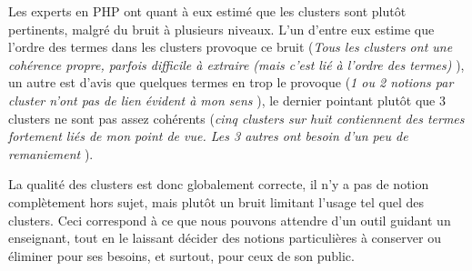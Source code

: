 Les experts en PHP ont quant à eux estimé que les clusters sont plutôt pertinents, malgré du bruit à plusieurs niveaux.
L'un d'entre eux estime que l'ordre des termes dans les clusters provoque ce bruit (\og \textit{Tous les clusters ont une cohérence propre, parfois difficile à extraire (mais c'est lié à l'ordre des termes)} \fg), un autre est d'avis que quelques termes en trop le provoque (\og \textit{1 ou 2 notions par cluster n'ont pas de lien évident à mon sens} \fg), le dernier pointant plutôt que 3 clusters ne sont pas assez cohérents (\og \textit{cinq clusters sur huit contiennent des termes fortement liés de mon point de vue. Les 3 autres ont besoin d'un peu de remaniement} \fg).

\bigskip

La qualité des clusters est donc globalement correcte, il n'y a pas de notion complètement hors sujet, mais plutôt un bruit limitant l'usage tel quel des clusters.
Ceci correspond à ce que nous pouvons attendre d'un outil guidant un enseignant, tout en le laissant décider des notions particulières à conserver ou éliminer pour ses besoins, et surtout, pour ceux de son public.



